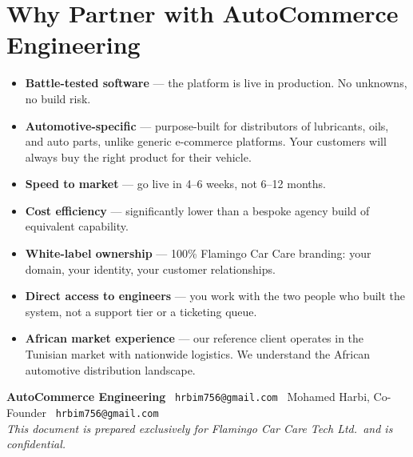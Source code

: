 \documentclass[11pt,a4paper]{article}
\begin{document}
\section{Why Partner with AutoCommerce Engineering}

\begin{itemize}[leftmargin=1.4em,itemsep=3pt]
  \item \textbf{Battle-tested software} --- the platform is live in
        production. No unknowns, no build risk.
  \item \textbf{Automotive-specific} --- purpose-built for distributors
        of lubricants, oils, and auto parts, unlike generic e-commerce
        platforms. Your customers will always buy the right product for
        their vehicle.
  \item \textbf{Speed to market} --- go live in 4--6 weeks, not 6--12
        months.
  \item \textbf{Cost efficiency} --- significantly lower than a
        bespoke agency build of equivalent capability.
  \item \textbf{White-label ownership} --- 100\% Flamingo Car Care
        branding: your domain, your identity, your customer
        relationships.
  \item \textbf{Direct access to engineers} --- you work with the two
        people who built the system, not a support tier or a ticketing
        queue.
  \item \textbf{African market experience} --- our reference client
        operates in the Tunisian market with nationwide logistics.
        We understand the African automotive distribution landscape.
\end{itemize}

\vfill
\begin{center}
  \small\color{gray}
  \textbf{AutoCommerce Engineering} \textbar\
  \texttt{hrbim756@gmail.com} \textbar\
  Mohamed Harbi, Co-Founder \textbar\
  \texttt{hrbim756@gmail.com}\\[0.3em]
  \textit{This document is prepared exclusively for Flamingo Car Care
  Tech Ltd.\ and is confidential.}
\end{center}
\end{document}
